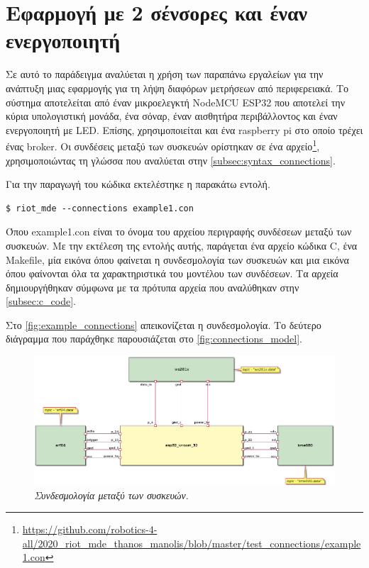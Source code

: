 \section{Εφαρμογή με 2 σένσορες και έναν ενεργοποιητή}
\label{sec:example1}

Σε αυτό το παράδειγμα αναλύεται η χρήση των παραπάνω εργαλείων για την ανάπτυξη μιας εφαρμογής για τη λήψη διαφόρων μετρήσεων από περιφερειακά. Το σύστημα αποτελείται από έναν μικροελεγκτή NodeMCU ESP32 που αποτελεί την κύρια υπολογιστική μονάδα, ένα σόναρ, έναν αισθητήρα περιβάλλοντος και έναν ενεργοποιητή με LED. Επίσης, χρησιμοποιείται και ένα raspberry pi στο οποίο τρέχει ένας broker. Οι συνδέσεις μεταξύ των συσκευών ορίστηκαν σε ένα αρχείο\footnote{\url{https://github.com/robotics-4-all/2020_riot_mde_thanos_manolis/blob/master/test_connections/example1.con}}, χρησιμοποιώντας τη γλώσσα που αναλύεται στην \autoref{subsec:syntax_connections}.

Για την παραγωγή του κώδικα εκτελέστηκε η παρακάτω εντολή.

\begin{lstlisting}
$ riot_mde --connections example1.con
\end{lstlisting}

Όπου example1.con είναι το όνομα του αρχείου περιγραφής συνδέσεων μεταξύ των συσκευών. Με την εκτέλεση της εντολής αυτής, παράγεται ένα αρχείο κώδικα C, ένα Makefile, μία εικόνα όπου φαίνεται η συνδεσμολογία των συσκευών και μια εικόνα όπου φαίνονται όλα τα χαρακτηριστικά του μοντέλου των συνδέσεων. Τα αρχεία δημιουργήθηκαν σύμφωνα με τα πρότυπα αρχεία που αναλύθηκαν στην \autoref{subsec:c_code}.

Στο \autoref{fig:example_connections} απεικονίζεται η συνδεσμολογία. Το δεύτερο διάγραμμα που παράχθηκε παρουσιάζεται στο \autoref{fig:connections_model}.

\begin{figure}[!ht]
	\centering
	\includegraphics[width=1.0\textwidth]{./images/chapter6/example1a.png}
	\caption[\textit{Συνδεσμολογία μεταξύ των συσκευών}.]{\textit{Συνδεσμολογία μεταξύ των συσκευών}.}
	\label{fig:example_connections}
\end{figure}

